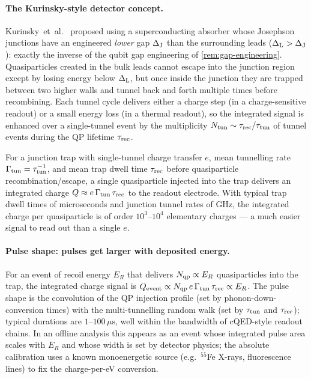 \paragraph{The Kurinsky-style detector concept.}
Kurinsky~et~al.~\cite{kurinsky2020} proposed using a
superconducting absorber whose Josephson junctions have an
engineered \emph{lower} gap $\Delta_{\rm J}$ than the surrounding
leads ($\Delta_{\rm L} > \Delta_{\rm J}$): exactly the inverse of
the qubit gap engineering of \cref{rem:gap-engineering}.
Quasiparticles created in the bulk leads cannot escape into the
junction region except by losing energy below $\Delta_{\rm L}$,
but once inside the junction they are trapped between two higher
walls and tunnel back and forth multiple times before recombining.
Each tunnel cycle delivers either a charge step (in a
charge-sensitive readout) or a small energy loss (in a thermal
readout), so the integrated signal is enhanced over a single-tunnel
event by the multiplicity
$N_{\rm tun}\sim\tau_{\rm rec}/\tau_{\rm tun}$ of tunnel events
during the QP lifetime $\tau_{\rm rec}$.

\begin{statement}
\label{stmt:multi-tunnel}
For a junction trap with single-tunnel charge transfer $e$, mean
tunnelling rate $\Gamma_{\rm tun}=\tau_{\rm tun}^{-1}$, and mean
trap dwell time $\tau_{\rm rec}$ before quasiparticle
recombination/escape, a single quasiparticle injected into the
trap delivers an integrated charge
$Q\approx e\,\Gamma_{\rm tun}\,\tau_{\rm rec}$ to the readout
electrode. With typical trap dwell times of microseconds and
junction tunnel rates of GHz, the integrated charge per
quasiparticle is of order $10^3$--$10^4$ elementary charges ---
a much easier signal to read out than a single $e$.
\end{statement}

\paragraph{Pulse shape: pulses get larger with deposited energy.}
For an event of recoil energy $E_R$ that delivers
$N_{\rm qp}\propto E_R$ quasiparticles into the trap, the
integrated charge signal is
$Q_{\rm event}\propto N_{\rm qp}\,e\,\Gamma_{\rm tun}\,\tau_{\rm rec}\propto E_R$.
The pulse shape is the convolution of the QP injection profile
(set by phonon-down-conversion times) with the multi-tunnelling
random walk (set by $\tau_{\rm tun}$ and $\tau_{\rm rec}$);
typical durations are $1$--$100\,\mu\text{s}$, well within the
bandwidth of cQED-style readout chains. In an offline analysis
this appears as an event whose integrated pulse area scales with
$E_R$ and whose width is set by detector physics; the absolute
calibration uses a known monoenergetic source (e.g.\ $^{55}$Fe
X-rays, fluorescence lines) to fix the charge-per-eV conversion.

